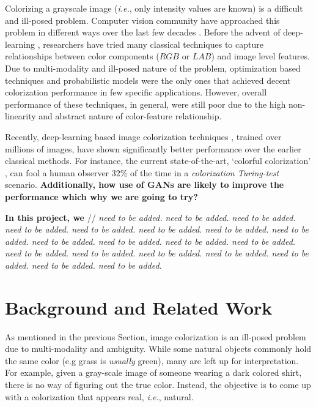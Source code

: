 \documentclass[10pt]{article}
\begin{document}
Colorizing a grayscale image (\textit{i.e.}, only intensity values are known) is a difficult and ill-posed problem. Computer vision community have approached this problem in different ways over the last few decades \cite{zhang2016colorful, cheng2015deep, bugeau2014variational, charpiat2008automatic, luan2007natural, konushin2006interactive}. Before the advent of deep-learning \cite{lecun2015deep}, researchers have tried many classical techniques \cite{charpiat2008automatic, luan2007natural, konushin2006interactive, levin2004colorization, lagodzinski2008digital} to capture relationships between color components ($RGB$ or $LAB$) and image level features. 
Due to multi-modality and ill-posed nature of the problem, optimization based techniques \cite{levin2004colorization, charpiat2008automatic} and probabilistic models \cite{lagodzinski2008digital} were the only ones that achieved decent colorization performance in few specific applications. 
However, overall performance of these techniques, in general, were still poor due to the high non-linearity and abstract nature of color-feature relationship.  

Recently, deep-learning based image colorization techniques \cite{zhang2016colorful, cheng2015deep, varga2016fully, li2017watergan}, trained over millions of images, have shown significantly better performance over the earlier classical methods. For instance, the current state-of-the-art, `colorful colorization' \cite{zhang2016colorful}, can fool a human observer $32\%$ of the time in a \textit{colorization Turing-test} scenario. \textbf{Additionally,  how use of GANs are likely to improve the performance which why we are going to try?}

\textbf{In this project, we } 
// \textit{need to be added. need to be added. need to be added. need to be added. need to be added. need to be added. need to be added. need to be added.
need to be added. need to be added. need to be added. need to be added. need to be added. need to be added.
need to be added. need to be added. need to be added. need to be added. need to be added.}

\section{Background and Related Work}\label{sec:back}
As mentioned in the previous Section, image colorization is an ill-posed problem due to multi-modality and ambiguity. 
While some natural objects commonly hold the same color (e.g grass is \textit{usually} green), many are left up for interpretation. 
For example, given a gray-scale image of someone wearing a dark colored shirt, 
there is no way of figuring out the true color. 
Instead, the objective is to come up with a colorization that appears real, \textit{i.e.}, natural. 
\end{document}
